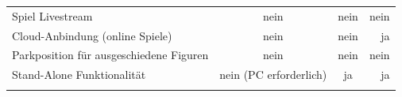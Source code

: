 \begin{longtable}[]{@{}lccr@{}}
\begin{minipage}[t]{0.19\columnwidth}
Spiel Livestream\strut
\end{minipage} & \begin{minipage}[t]{0.25\columnwidth}\centering
nein\strut
\end{minipage} & \begin{minipage}[t]{0.26\columnwidth}\centering
nein\strut
\end{minipage} & \begin{minipage}[t]{0.19\columnwidth}\raggedleft
nein\strut
\end{minipage}\tabularnewline
\begin{minipage}[t]{0.19\columnwidth}\raggedright
Cloud-Anbindung (online Spiele)\strut
\end{minipage} & \begin{minipage}[t]{0.25\columnwidth}\centering
nein\strut
\end{minipage} & \begin{minipage}[t]{0.26\columnwidth}\centering
nein\strut
\end{minipage} & \begin{minipage}[t]{0.19\columnwidth}\raggedleft
ja\strut
\end{minipage}\tabularnewline
\begin{minipage}[t]{0.19\columnwidth}\raggedright
Parkposition für ausgeschiedene Figuren\strut
\end{minipage} & \begin{minipage}[t]{0.25\columnwidth}\centering
nein\strut
\end{minipage} & \begin{minipage}[t]{0.26\columnwidth}\centering
nein\strut
\end{minipage} & \begin{minipage}[t]{0.19\columnwidth}\raggedleft
nein\strut
\end{minipage}\tabularnewline
\begin{minipage}[t]{0.19\columnwidth}\raggedright
Stand-Alone Funktionalität\strut
\end{minipage} & \begin{minipage}[t]{0.25\columnwidth}\centering
nein (PC erforderlich)\strut
\end{minipage} & \begin{minipage}[t]{0.26\columnwidth}\centering
ja\strut
\end{minipage} & \begin{minipage}[t]{0.19\columnwidth}\raggedleft
ja\strut
\end{minipage}\tabularnewline
\begin{minipage}[t]{0.19\columnwidth}\raggedright

\end{minipage}
\end{longtable}
